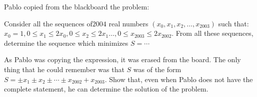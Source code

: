 Pablo copied from the blackboard the problem:



Consider all the sequences of$2004$ real numbers $(x_0,x_1,x_2,\dots, x_{2003})$ such that: $x_0=1, 0\le x_1\le 2x_0,0\le x_2\le 2x_1\ldots ,0\le x_{2003}\le 2x_{2002}$. From all these sequences, determine the sequence which minimizes $S=\cdots$

As Pablo was copying the expression, it was erased from the board. The only thing that he could remember was that $S$ was of the form $S=\pm x_1\pm x_2\pm\cdots\pm x_{2002}+x_{2003}$. Show that, even when Pablo does not have the complete statement, he can determine the solution of the problem.